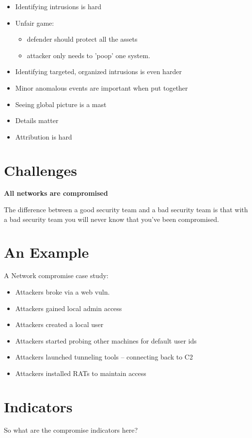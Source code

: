 \documentclass[11pt]{article}
\begin{document}
\begin{itemize}
\item Identifying intrusions is hard
\item Unfair game:
\begin{itemize}
\item defender should protect all the assets
\item attacker only needs to 'poop' one system.
\end{itemize}
\item Identifying targeted, organized intrusions is even harder
\item Minor anomalous events are important when put together
\item Seeing global picture is a mast
\item Details matter
\item Attribution is hard
\end{itemize}
\section*{Challenges}
\label{sec-10}
\textbf{All networks are compromised}


The difference between a good security team and a bad security team is
that with a bad security team you will never know that you've been
compromised.

\section*{An Example}
\label{sec-11}
A Network compromise case study:
\begin{itemize}
\item Attackers broke via a web vuln.
\item Attackers gained local admin access
\item Attackers created a local user
\item Attackers started probing other machines for default user ids
\item Attackers launched tunneling tools – connecting back to C2
\item Attackers installed RATs to maintain access
\end{itemize}
\section*{Indicators}
\label{sec-12}

So what are the compromise indicators here?
\end{document}
